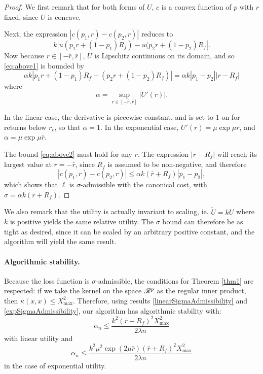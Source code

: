 \begin{proof}We first remark that for both forms of $U$, $c$ is a convex function of $p$
  with $r$ fixed, since $U$ is concave.

Next, the expression $|c(p_1,r)-c(p_2,r)|$ reduces to
\begin{equation}
  \label{eq:above1} 
  k|u(p_1r + (1-p_1)R_f) - u(p_2r + (1-p_2)R_f|.
\end{equation} Now because $r\in[-\bar r,\bar r]$, $U$ is Lipschitz continuous on its
domain, and so \eqref{eq:above1} is bounded by
\begin{equation}
  \label{eq:above2} 
  \alpha k|p_1r + (1-p_1)R_f - (p_2r + (1-p_2)R_f)| = \alpha k|p_1-p_2||r-R_f|
\end{equation} 
where
\begin{equation*} 
  \alpha = \sup_{r\in[-\bar r,\bar r]} |U'(r)|.
\end{equation*}

In the linear case, the derivative is piecewise constant, and is set to 1 on for returns
below $r_c$, so that $\alpha=1$. In the exponential case, $U'(r) = \mu\exp\mu r$, and $\alpha
= \mu\exp \mu \bar r$.

The bound \eqref{eq:above2} must hold for any $r$. The expression $|r-R_f|$ will reach
its largest value at $r=-\bar r$, since $R_f$ is assumed to be non-negative, and therefore
\begin{equation*} 
  |c(p_1,r) - c(p_2,r)| \leq \alpha k(\bar r + R_f)|p_1-p_2|,
\end{equation*} 
which shows that $\ell$ is $\sigma$-admissible with the canonical cost,
with $\sigma=\alpha k(\bar r+ R_f)$.
\end{proof}

We also remark that the utility is actually invariant to scaling, ie. $\tilde{U} = kU$
where $k$ is positive yields the same relative utility. The $\sigma$ bound can therefore
be as tight as desired, since it can be scaled by an arbitrary positive constant, and the
algorithm will yield the same result.

\paragraph{Algorithmic stability.}
Because the loss function is $\sigma$-admissible, the conditions for Theorem \ref{thm1}
are respected: if we take the kernel on the space $\mathscr{R}^p$ as the regular inner product,
then $\kappa(x,x)\leq X^2_{\max}$. Therefore, using results
\eqref{linearSigmaAdmissibility} and \eqref{expSigmaAdmissibility}, our algorithm has
algorithmic stability with:
\begin{equation}
  \label{algoStabilityLinear}
  \alpha_n \leq \frac{k^2(\bar r+R_f)^2X^2_{\max}}{2\lambda n}
\end{equation}
 with linear utility and
\begin{equation*}
   \alpha_n \leq \frac{k^2 \mu^2 \exp(2\mu\bar r)(\bar r + R_f)^2 X^2_{\max}}{2\lambda n}
\end{equation*}
in the case of exponential utility.

